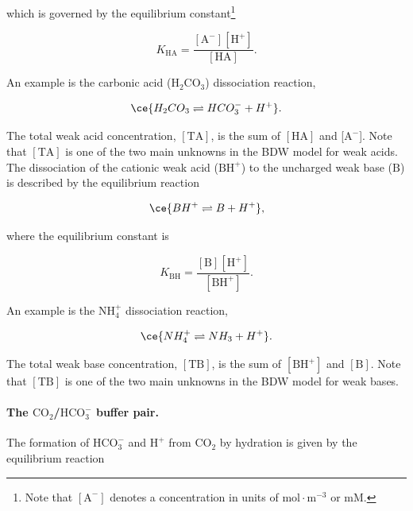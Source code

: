 \documentclass[fleqn,10pt]{physiome}
\begin{document}
which is governed by the equilibrium constant\footnote{Note that $\mathrm{[A^-]}$ denotes a concentration in units of $\mathrm{mol\cdot m^{-3}}$ or $\mathrm{mM}$.}

\begin{equation}
K_\mathrm{HA}=\dfrac{\mathrm{[A^-][H^+]}}{\mathrm{[HA]}}.
\label{eqn:K_A}
\end{equation}

An example is the carbonic acid ($\mathrm{H_2CO_3}$) dissociation reaction,

\begin{equation*}
\ce{H_2CO_3 \rightleftharpoons HCO_3^- + H^+}.
\end{equation*}

The total weak acid concentration, $\mathrm{[TA]}$, is the sum of $\mathrm{[HA]}$ and [$\mathrm{A^-}$]. Note that $\mathrm{[TA]}$ is one of the two main unknowns in the BDW model for weak acids.\\

The dissociation of the cationic weak acid ($\mathrm{BH^+}$) to the uncharged weak base ($\mathrm{B}$) is described by the equilibrium reaction

\begin{equation}
\ce{BH^+ \rightleftharpoons B + H^+},
\end{equation}

where the equilibrium constant is

\begin{equation}
K_\mathrm{BH}=\dfrac{\mathrm{[B][H^+]}}{\mathrm{[BH^+]}}.
\end{equation}

An example is the $\mathrm{NH_4^+}$ dissociation reaction,

\begin{equation*}
\ce{NH_4^+ \rightleftharpoons NH_3 + H^+}.
\end{equation*}

The total weak base concentration, $\mathrm{[TB]}$, is the sum of $\mathrm{[BH^+]}$ and $\mathrm{[B]}$. Note that $\mathrm{[TB]}$ is one of the two main unknowns in the BDW model for weak bases.


\paragraph{The $\mathrm{CO_2}$/$\mathrm{HCO_3^-}$ buffer pair.}
The formation of $\mathrm{HCO_3^-}$ and $\mathrm{H^+}$ from $\mathrm{CO_2}$ by hydration is given by the equilibrium reaction
\end{document}
